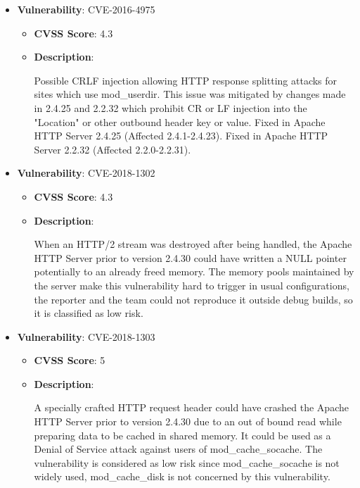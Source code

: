 \documentclass{article}
\begin{document}
\begin{itemize}
        \item \textbf{Vulnerability}: CVE-2016-4975
        \begin{itemize}
            \item \textbf{CVSS Score}:  4.3 
            \item \textbf{Description}:
            \parbox[t]{0.9\linewidth}{
                \ttfamily Possible CRLF injection allowing HTTP response splitting attacks for sites which use mod\_userdir. This issue was mitigated by changes made in 2.4.25 and 2.2.32 which prohibit CR or LF injection into the "Location" or other outbound header key or value. Fixed in Apache HTTP Server 2.4.25 (Affected 2.4.1-2.4.23). Fixed in Apache HTTP Server 2.2.32 (Affected 2.2.0-2.2.31).
            }
        \end{itemize}
    
        \item \textbf{Vulnerability}: CVE-2018-1302
        \begin{itemize}
            \item \textbf{CVSS Score}:  4.3 
            \item \textbf{Description}:
            \parbox[t]{0.9\linewidth}{
                \ttfamily When an HTTP/2 stream was destroyed after being handled, the Apache HTTP Server prior to version 2.4.30 could have written a NULL pointer potentially to an already freed memory. The memory pools maintained by the server make this vulnerability hard to trigger in usual configurations, the reporter and the team could not reproduce it outside debug builds, so it is classified as low risk.
            }
        \end{itemize}
    
        \item \textbf{Vulnerability}: CVE-2018-1303
        \begin{itemize}
            \item \textbf{CVSS Score}:  5 
            \item \textbf{Description}:
            \parbox[t]{0.9\linewidth}{
                \ttfamily A specially crafted HTTP request header could have crashed the Apache HTTP Server prior to version 2.4.30 due to an out of bound read while preparing data to be cached in shared memory. It could be used as a Denial of Service attack against users of mod\_cache\_socache. The vulnerability is considered as low risk since mod\_cache\_socache is not widely used, mod\_cache\_disk is not concerned by this vulnerability.
            }
        \end{itemize}
    

\end{itemize}
\end{document}
